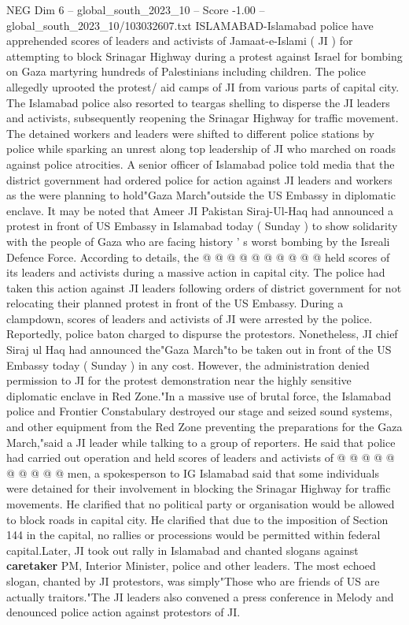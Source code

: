 \begin{textsample}{NEG Dim 6 – global\_south\_2023\_10 – Score -1.00 – global\_south\_2023\_10/103032607.txt}  \label{ex:f6_neg_209}
ISLAMABAD-Islamabad police have apprehended scores of leaders and activists of Jamaat-e-Islami ( JI ) for attempting to block Srinagar Highway during a protest against Israel for bombing on Gaza martyring hundreds of Palestinians including children.
The police allegedly uprooted the protest/ aid camps of JI from various parts of capital city.
The Islamabad police also resorted to teargas shelling to disperse the JI leaders and activists, subsequently reopening the Srinagar Highway for traffic movement.
The detained workers and leaders were shifted to different police stations by police while sparking an unrest along top leadership of JI who marched on roads against police atrocities.
A senior officer of Islamabad police told media that the district government had ordered police for action against JI leaders and workers as the were planning to hold"Gaza March"outside the US Embassy in diplomatic enclave.
It may be noted that Ameer JI Pakistan Siraj-Ul-Haq had announced a protest in front of US Embassy in Islamabad today ( Sunday ) to show solidarity with the people of Gaza who are facing history ' s worst bombing by the Isreali Defence Force.
According to details, the @ @ @ @ @ @ @ @ @ @ held scores of its leaders and activists during a massive action in capital city.
The police had taken this action against JI leaders following orders of district government for not relocating their planned protest in front of the US Embassy.
During a clampdown, scores of leaders and activists of JI were arrested by the police.
Reportedly, police baton charged to dispurse the protestors.
Nonetheless, JI chief Siraj ul Haq had announced the"Gaza March"to be taken out in front of the US Embassy today ( Sunday ) in any cost.
However, the administration denied permission to JI for the protest demonstration near the highly sensitive diplomatic enclave in Red Zone."In a massive use of brutal force, the Islamabad police and Frontier Constabulary destroyed our stage and seized sound systems, and other equipment from the Red Zone preventing the preparations for the Gaza March,"said a JI leader while talking to a group of reporters.
He said that police had carried out operation and held scores of leaders and activists of @ @ @ @ @ @ @ @ @ @ men, a spokesperson to IG Islamabad said that some individuals were detained for their involvement in blocking the Srinagar Highway for traffic movements.
He clarified that no political party or organisation would be allowed to block roads in capital city.
He clarified that due to the imposition of Section 144 in the capital, no rallies or processions would be permitted within federal capital.Later, JI took out rally in Islamabad and chanted slogans against \textbf{caretaker} PM, Interior Minister, police and other leaders.
The most echoed slogan, chanted by JI protestors, was simply"Those who are friends of US are actually traitors."The JI leaders also convened a press conference in Melody and denounced police action against protestors of JI.

\end{textsample}
